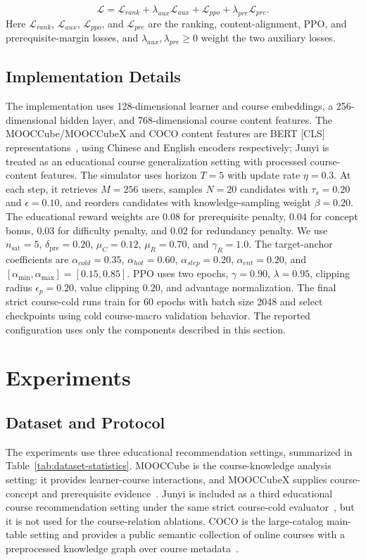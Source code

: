 \documentclass[letterpaper]{article}
\begin{document}
\begin{equation}
\mathcal{L}=
\mathcal{L}_{rank}
+\lambda_{aux}\mathcal{L}_{aux}
+\mathcal{L}_{ppo}
+\lambda_{pre}\mathcal{L}_{pre}.
\end{equation}
Here \(\mathcal{L}_{rank}\), \(\mathcal{L}_{aux}\), \(\mathcal{L}_{ppo}\), and \(\mathcal{L}_{pre}\) are the ranking, content-alignment, PPO, and prerequisite-margin losses, and \(\lambda_{aux},\lambda_{pre}\geq0\) weight the two auxiliary losses.

\subsection{Implementation Details}
The implementation uses 128-dimensional learner and course embeddings, a 256-dimensional hidden layer, and 768-dimensional course content features. The MOOCCube/MOOCCubeX and COCO content features are BERT [CLS] representations~\cite{devlin2019bert}, using Chinese and English encoders respectively; Junyi is treated as an educational course generalization setting with processed course-content features. The simulator uses horizon \(T=5\) with update rate \(\eta=0.3\). At each step, it retrieves \(M=256\) users, samples \(N=20\) candidates with \(\tau_s=0.20\) and \(\epsilon=0.10\), and reorders candidates with knowledge-sampling weight \(\beta=0.20\). The educational reward weights are \(0.08\) for prerequisite penalty, \(0.04\) for concept bonus, \(0.03\) for difficulty penalty, and \(0.02\) for redundancy penalty. We use \(n_{\mathrm{sat}}=5\), \(\delta_{\mathrm{pre}}=0.20\), \(\mu_C=0.12\), \(\mu_R=0.70\), and \(\gamma_R=1.0\). The target-anchor coefficients are \(\alpha_{cold}=0.35\), \(\alpha_{hot}=0.60\), \(\alpha_{step}=0.20\), \(\alpha_{ent}=0.20\), and \([\alpha_{\min},\alpha_{\max}]=[0.15,0.85]\). PPO uses two epochs, \(\gamma=0.90\), \(\lambda=0.95\), clipping radius \(\epsilon_p=0.20\), value clipping \(0.20\), and advantage normalization. The final strict course-cold runs train for 60 epochs with batch size 2048 and select checkpoints using cold course-macro validation behavior. The reported configuration uses only the components described in this section.

\section{Experiments}
\subsection{Dataset and Protocol}
The experiments use three educational recommendation settings, summarized in Table~\ref{tab:dataset-statistics}. MOOCCube is the course-knowledge analysis setting: it provides learner-course interactions, and MOOCCubeX supplies course-concept and prerequisite evidence~\cite{yu2020mooccube,wang2021mooccubex}. Junyi is included as a third educational course recommendation setting under the same strict course-cold evaluator~\cite{chen2020junyi}, but it is not used for the course-relation ablations. COCO is the large-catalog main-table setting and provides a public semantic collection of online courses with a preprocessed knowledge graph over course metadata~\cite{dessi2018coco}.
\end{document}
